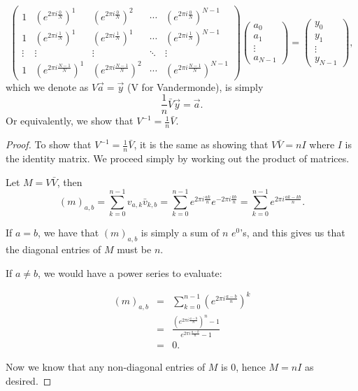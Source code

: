 \documentclass[../article.tex]{subfiles}
\begin{document}
\begin{equation*}
\begin{pmatrix}
1 & (e^{2\pi i\frac{0}{N}})^1 & (e^{2\pi i\frac{0}{N}})^2 & \cdots & (e^{2\pi i\frac{0}{N}})^{N-1}\\
1 & (e^{2\pi i\frac{1}{N}})^1 & (e^{2\pi i\frac{1}{N}})^1 & \cdots & (e^{2\pi i\frac{1}{N}})^{N-1}\\
\vdots & \vdots & \vdots & \ddots & \vdots\\
1 & (e^{2\pi i\frac{N-1}{N}})^1  & (e^{2\pi i\frac{N-1}{N}})^{2}& \cdots & (e^{2\pi i\frac{N-1}{N}})^{N-1}
\end{pmatrix}
\begin{pmatrix}
a_0\\
a_1\\
\vdots\\
a_{N-1}
\end{pmatrix}
=
\begin{pmatrix}
y_0\\
y_1\\
\vdots\\
y_{N-1}
\end{pmatrix},
\end{equation*}
which we denote as $V\vec{a}=\vec{y}$ (V for Vandermonde), is simply
\begin{equation*}
\frac{1}{n}\bar{V}\vec{y} = \vec{a}.
\end{equation*}
Or equivalently, we show that $V^{-1} = \frac{1}{n} \bar{V}$.
\bigskip
\begin{proof}
To show that $V^{-1} = \frac{1}{n} \bar{V}$, it is the same as showing that $V\bar{V} = nI$ where $I$ is the identity matrix. We proceed simply by working out the product of matrices.

Let $M = V\bar{V}$, then
\begin{equation*}
(m)_{a,b} = \displaystyle \sum_{k=0}^{n-1} v_{a,k}\bar{v}_{k,b} = \displaystyle \sum_{k=0}^{n-1} e^{2\pi i \frac{ak}{n}}e^{-2\pi i \frac{kb}{n}} = \displaystyle \sum_{k=0}^{n-1} e^{2\pi i \frac{ak-kb}{n}}.
\end{equation*}

If $a=b$, we have that $(m)_{a,b}$ is simply a sum of $n$ $e^{0}$'s, and this gives us that the diagonal entries of $M$ must be $n$.

If $a\ne b$, we would have a power series to evaluate:

\begin{eqnarray*}
(m)_{a,b} &=& \displaystyle \sum_{k=0}^{n-1} \left(e^{2\pi i \frac{a-b}{n}}\right)^{k}\\
&=& \frac{\left(e^{2\pi i \frac{a-b}{n}}\right)^{n}-1}{e^{2\pi i \frac{a-b}{n}}-1}\\
&=& 0.
\end{eqnarray*}

Now we know that any non-diagonal entries of $M$ is 0, hence $M = nI$ as desired.
\end{proof}
\end{document}
